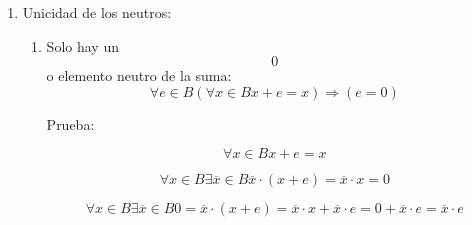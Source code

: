 \documentclass[
]{article}
\begin{document}
\begin{enumerate}
\begin{enumerate}
\begin{enumerate}
\begin{enumerate}
        \[{\lbrack\mathit{H2}\rbrack}\phantom{\exists{z \in B}}{{x + \overline{z}} = {y + \overline{z}}}\]

        \[{\left( {x + z} \right) \cdot \left( {x + \overline{z}} \right)} = {\left( {y + z} \right) \cdot \left( {y + \overline{z}} \right)}\]

        \[{x + \left( {z \cdot \overline{z}} \right)} = {y + \left( {z \cdot \overline{z}} \right)}\]

        \[{x + 0} = {y + 0}\]

        \[x = y\]
      \item
        Para el
        producto:\[\forall x,{y \in B}\left\lbrack {\exists{z \in B}\left\lbrack {\left( {{x \cdot z} = {y \cdot z}} \right) \land \left( {{x \cdot \overline{z}} = {y \cdot \overline{z}}} \right)} \right\rbrack} \right\rbrack\Rightarrow{x = y}\]

        Prueba:

        \[{\lbrack\mathit{H1}\rbrack}\exists{z \in B}{{x \cdot z} = {y \cdot z}}\]

        \[{\lbrack\mathit{H2}\rbrack}\phantom{\exists{z \in B}}{{x \cdot \overline{z}} = {y \cdot \overline{z}}}\]

        \[{\left( {x \cdot z} \right) + \left( {x \cdot \overline{z}} \right)} = {\left( {y \cdot z} \right) + \left( {y \cdot \overline{z}} \right)}\]

        \[{x \cdot \left( {z + \overline{z}} \right)} = {y \cdot \left( {z + \overline{z}} \right)}\]

        \[{x \cdot 1} = {y \cdot 1}\]

        \[x = y\]
      \end{enumerate}
    \item
      Unicidad de los neutros:

      \begin{enumerate}
      \def\labelenumiv{\arabic{enumiv}.}
      \item
        Solo hay un \[0\]o elemento neutro de la
        suma:\[\forall{e \in B}{{({\forall{x \in B}{{x + e} = x}})}\Rightarrow{({e = 0})}}\]

        Prueba:

        \[\forall{x \in B}{x + e}{=}x\]

        \[\forall{x \in B}\exists{\overline{x} \in B}{{{\overline{x} \cdot {({x + e})}} = {\overline{x} \cdot x}} = 0}\]

        \[\forall{x \in B}\exists{\overline{x} \in B}{{{{0 = {\overline{x} \cdot {({x + e})}}} = {{\overline{x} \cdot x} + {\overline{x} \cdot e}}} = {0 + {\overline{x} \cdot e}}} = {\overline{x} \cdot e}}\]


\end{enumerate}
\end{enumerate}
\end{enumerate}
\end{enumerate}
\end{document}
